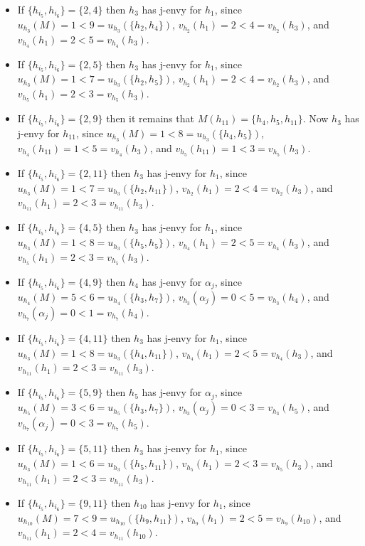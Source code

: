 \begin{itemize}
\begin{itemize}
    \begin{itemize}
        \item If $\{ h_{i_5}, h_{i_6} \} = \{ 2, 4 \}$ then $h_3$ has j-envy for $h_1$, since $u_{h_3}(M) = 1 < 9 = u_{h_3}(\{ h_2, h_4 \})$, $v_{h_2}(h_1) = 2 < 4 = v_{h_2}(h_3)$, and $v_{h_4}(h_1) = 2 < 5 = v_{h_4}(h_3)$.
        \item If $\{ h_{i_5}, h_{i_6} \} = \{ 2, 5 \}$ then $h_3$ has j-envy for $h_1$, since $u_{h_3}(M) = 1 < 7 = u_{h_3}(\{ h_2, h_5 \})$, $v_{h_2}(h_1) = 2 < 4 = v_{h_2}(h_3)$, and $v_{h_5}(h_1) = 2 < 3 = v_{h_5}(h_3)$.
        \item If $\{ h_{i_5}, h_{i_6} \} = \{ 2, 9 \}$ then it remains that $M(h_{11}) = \{ h_4, h_5, h_{11} \}$. Now $h_3$ has j-envy for $h_{11}$, since $u_{h_3}(M) = 1 < 8 = u_{h_3}(\{ h_4, h_5 \})$, $v_{h_4}(h_{11}) = 1 < 5 = v_{h_4}(h_3)$, and $v_{h_5}(h_{11}) = 1 < 3 = v_{h_5}(h_3)$.
        \item If $\{ h_{i_5}, h_{i_6} \} = \{ 2, 11 \}$ then $h_3$ has j-envy for $h_1$, since $u_{h_3}(M) = 1 < 7 = u_{h_3}(\{ h_2, h_{11} \})$, $v_{h_2}(h_1) = 2 < 4 = v_{h_2}(h_3)$, and $v_{h_{11}}(h_1) = 2 < 3 = v_{h_{11}}(h_3)$.
        \item If $\{ h_{i_5}, h_{i_6} \} = \{ 4, 5 \}$ then $h_3$ has j-envy for $h_1$, since $u_{h_3}(M) = 1 < 8 = u_{h_3}(\{ h_5, h_5 \})$, $v_{h_4}(h_1) = 2 < 5 = v_{h_4}(h_3)$, and $v_{h_5}(h_1) = 2 < 3 = v_{h_5}(h_3)$.
        \item If $\{ h_{i_5}, h_{i_6} \} = \{ 4, 9 \}$ then $h_4$ has j-envy for $\alpha_{j}$, since $u_{h_4}(M) = 5 < 6 = u_{h_4}(\{ h_3, h_7 \})$, $v_{h_3}(\alpha_{j}) = 0 < 5 = v_{h_3}(h_4)$, and $v_{h_7}(\alpha_{j}) = 0 < 1 = v_{h_7}(h_4)$.
        \item If $\{ h_{i_5}, h_{i_6} \} = \{ 4, 11 \}$ then $h_3$ has j-envy for $h_1$, since $u_{h_3}(M) = 1 < 8 = u_{h_3}(\{ h_4, h_{11} \})$, $v_{h_4}(h_1) = 2 < 5 = v_{h_4}(h_3)$, and $v_{h_{11}}(h_1) = 2 < 3 = v_{h_{11}}(h_3)$.
        \item If $\{ h_{i_5}, h_{i_6} \} = \{ 5, 9 \}$ then $h_5$ has j-envy for $\alpha_{j}$, since $u_{h_5}(M) = 3 < 6 = u_{h_5}(\{ h_3, h_7 \})$, $v_{h_3}(\alpha_{j}) = 0 < 3 = v_{h_3}(h_5)$, and $v_{h_7}(\alpha_{j}) = 0 < 3 = v_{h_7}(h_5)$.
        \item If $\{ h_{i_5}, h_{i_6} \} = \{ 5, 11 \}$ then $h_3$ has j-envy for $h_1$, since $u_{h_3}(M) = 1 < 6 = u_{h_3}(\{ h_5, h_{11} \})$, $v_{h_5}(h_1) = 2 < 3 = v_{h_5}(h_3)$, and $v_{h_{11}}(h_1) = 2 < 3 = v_{h_{11}}(h_3)$.
        \item If $\{ h_{i_5}, h_{i_6} \} = \{ 9, 11 \}$ then $h_{10}$ has j-envy for $h_1$, since $u_{h_{10}}(M) = 7 < 9 = u_{h_{10}}(\{ h_9, h_{11} \})$, $v_{h_9}(h_1) = 2 < 5 = v_{h_9}(h_{10})$, and $v_{h_{11}}(h_1) = 2 < 4 = v_{h_{11}}(h_{10})$.

\end{itemize}
\end{itemize}
\end{itemize}
